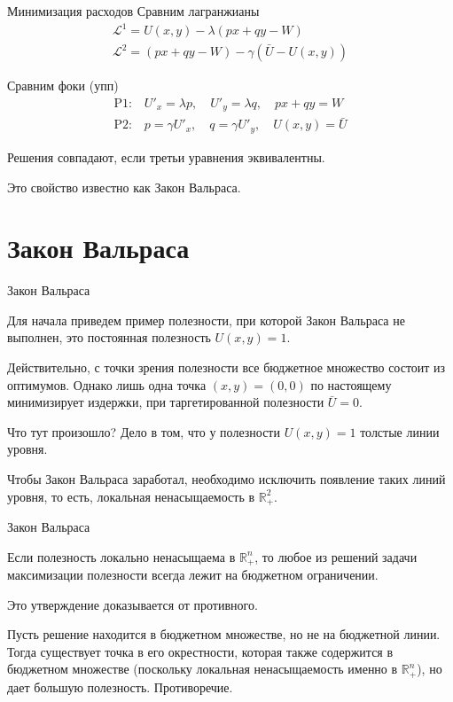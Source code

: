 \documentclass{beamer}
\begin{document}
\begin{frame}{Минимизация расходов}
Сравним лагранжианы
\begin{gather*}
\mathcal{L}^{1} = U(x, y) - \lambda (px + qy - W)\\
\mathcal{L}^{2} = (px + qy - W) - \gamma (\bar U - U(x,y))
\end{gather*}

Сравним фоки (упп)
\begin{gather*}
\text{P1:} \quad U'_x = \lambda p, \quad U'_y = \lambda q, \quad px + qy = W\\
\text{P2:} \quad p = \gamma U'_x, \quad q = \gamma U'_y, \quad U(x,y) = \bar U
\end{gather*}

Решения совпадают, если третьи уравнения эквивалентны.

Это свойство известно как Закон Вальраса.
\end{frame}

\section{Закон Вальраса}

\begin{frame}{Закон Вальраса}

Для начала приведем пример полезности, при которой Закон Вальраса не выполнен, это постоянная полезность $U(x,y) = 1$. 

Действительно, с точки зрения полезности все бюджетное множество состоит из оптимумов. Однако лишь одна точка $(x,y)=(0,0)$ по настоящему минимизирует издержки, при таргетированной полезности $\bar U = 0$. 

Что тут произошло? Дело в том, что у полезности $U(x,y) = 1$ толстые линии уровня. 

Чтобы Закон Вальраса заработал, необходимо исключить появление таких линий уровня, то есть, локальная ненасыщаемость в $\mathbb{R}^2_{+}$.

\end{frame}

\begin{frame}{Закон Вальраса}

\begin{theorem}
Если полезность локально ненасыщаема в $\mathbb{R}^n_{+}$, то любое из решений задачи максимизации полезности всегда лежит на бюджетном ограничении.
\end{theorem}

Это утверждение доказывается от противного. 

Пусть решение находится в бюджетном множестве, но не на бюджетной линии. Тогда существует точка в его окрестности, которая также содержится в бюджетном множестве (поскольку локальная ненасыщаемость именно в $\mathbb{R}^n_{+}$), но дает большую полезность. Противоречие.

\end{frame}
\end{document}
